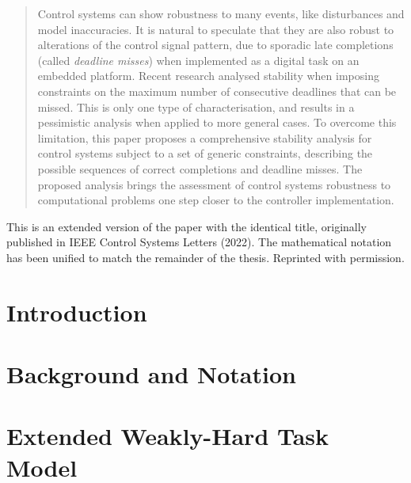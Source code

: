 \renewcommand\thisdir{papers/lcss22}
\renewcommand\figdir{\thisdir/figs}




\begin{abstract}
    Control systems can show robustness to many events, like disturbances and model inaccuracies.
    It is natural to speculate that they are also robust to alterations of the control signal pattern, due to sporadic late completions (called \emph{deadline misses}) when implemented as a digital task on an embedded platform.
    Recent research analysed stability when imposing constraints on the maximum number of consecutive deadlines that can be missed.
    This is only one type of characterisation, and results in a pessimistic analysis when applied to more general cases.
    To overcome this limitation, this paper proposes a comprehensive stability analysis for control systems subject to a set of generic constraints, describing the possible sequences  of correct completions and deadline misses.
    The proposed analysis brings the assessment of control systems robustness to computational problems one step closer to the controller implementation.
\end{abstract}

\vfill
This is an extended version of the paper with the identical title, originally published in IEEE Control Systems Letters (2022).
The mathematical notation has been unified to match the remainder of the thesis.
Reprinted with permission.
\newpage

\section{Introduction}
\label{sec:intro}


\section{Background and Notation}
\label{sec:background}


\section{Extended Weakly-Hard Task Model}
\label{sec:model}


